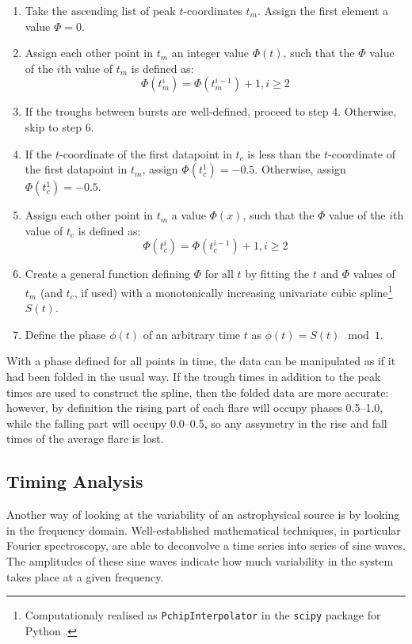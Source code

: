 \begin{enumerate}
  \item Take the ascending list of peak $t$-coordinates $t_m$.  Assign the first element a value $\Phi=0$.
  \item Assign each other point in $t_m$ an integer value $\Phi(t)$, such that the $\Phi$ value of the $i$th value of $t_m$ is defined as:
  \begin{equation}
  \Phi(t_m^{i})=\Phi(t_m^{i-1})+1, i\geq2
  \end{equation}
  \item If the troughs between bursts are well-defined, proceed to step 4.  Otherwise, skip to step 6.
  \item If the $t$-coordinate of the first datapoint in $t_c$ is less than the $t$-coordinate of the first datapoint in $t_m$, assign $\Phi(t_c^1)=-0.5$.  Otherwise, assign $\Phi(t_c^1)=-0.5$.
  \item Assign each other point in $t_m$ a value $\Phi(x)$, such that the $\Phi$ value of the $i$th value of $t_c$ is defined as:
  \begin{equation}
  \Phi(t_c^{i})=\Phi(t_c^{i-1})+1, i\geq2
  \end{equation}
  \item Create a general function defining $\Phi$ for all $t$ by fitting the $t$ and $\Phi$ values of $t_m$ (and $t_c$, if used) with a monotonically increasing univariate cubic spline\footnote{Computationaly realised as \texttt{PchipInterpolator} in the \texttt{scipy} package for Python \citep{NumPy}.} $S(t)$.
  \item Define the phase $\phi(t)$ of an arbitrary time $t$ as $\phi(t)=S(t)\mod1$.
\end{enumerate}

\par With a phase defined for all points in time, the data can be manipulated as if it had been folded in the usual way.  If the trough times in addition to the peak times are used to construct the spline, then the folded data are more accurate: however, by definition the rising part of each flare will occupy phases 0.5--1.0, while the falling part will occupy 0.0--0.5, so any assymetry in the rise and fall times of the average flare is lost.

\subsection{Timing Analysis}

\par Another way of looking at the variability of an astrophysical source is by looking in the frequency domain.  Well-established mathematical techniques, in particular Fourier spectroscopy, are able to deconvolve a time series into series of sine waves.  The amplitudes of these sine waves indicate how much variability in the system takes place at a given frequency.

